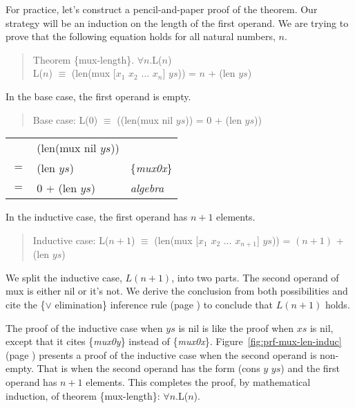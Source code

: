 For practice, let's construct a pencil-and-paper proof of the theorem.
Our strategy will be an induction on the length of the first operand.
We are trying to prove that the following equation holds for all natural numbers, $n$.
\begin{quote}
Theorem \{mux-length\}. $\forall n.$L($n$)\\
L($n$) $\equiv$ (len(mux [$x_1$ $x_2$ $\dots$ $x_n$] $ys$)) = $n$ + (len $ys$) \\
\end{quote}

In the base case, the first operand is empty.
\begin{quote}
Base case: L($0$) $\equiv$ ((len(mux nil $ys$)) = 0 + (len $ys$))
\end{quote}
\begin{center}
\begin{tabular}{lll}
     & (len(mux nil $ys$))    &                 \\
 $=$ & (len $ys$)             & \{\emph{mux0x}\}\\
 $=$ & 0 + (len $ys$)         & \emph{algebra}  \\
\end{tabular}
\end{center}

In the inductive case, the first operand has $n+1$ elements.
\begin{quote}
\label{mux-length-thm-induc-case}
Inductive case: L($n+1$) $\equiv$ (len(mux [$x_1$ $x_2$ $\dots$ $x_{n+1}$] $ys$)) = $(n+1)$ + (len $ys$)
\end{quote}

We split the inductive case, $L(n+1)$, into two parts.
The second operand of mux is either nil or it's not.
We derive the conclusion from both possibilities and cite the \{$\vee$ elimination\}
inference rule (page \pageref{fig-02-deduction-rules})
to conclude that $L(n+1)$ holds.

The proof of the inductive case when $ys$ is nil
is like the proof when $xs$ is nil,
except that it cites \{\emph{mux0y}\} instead of \{\emph{mux0x}\}.
Figure~\ref{fig:prf-mux-len-induc} (page \pageref{fig:prf-mux-len-induc})
presents a proof  of the inductive case when the second operand is non-empty.
That is when the second operand has the form (cons $y$ $ys$)
and the first operand has $n+1$ elements.
This completes the proof, by mathematical induction, of
theorem \{mux-length\}: $\forall n.$L($n$).

